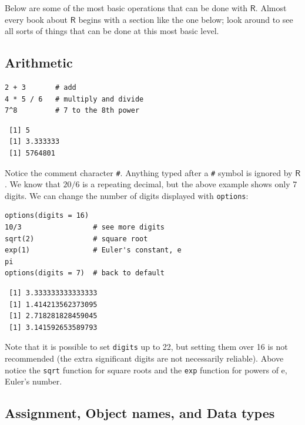 \documentclass[captions=tableheading]{scrbook}
\begin{document}
Below are some of the most basic operations that can be done with \(\mathsf{R}\). Almost every book about \(\mathsf{R}\) begins with a section like the one below; look around to see all sorts of things that can be done at this most basic level.
\subsection{Arithmetic}
\label{sec-2-3-1}
\label{sub-Arithmetic}



\begin{verbatim}
2 + 3       # add
4 * 5 / 6   # multiply and divide
7^8         # 7 to the 8th power
\end{verbatim}

\begin{verbatim}
 [1] 5
 [1] 3.333333
 [1] 5764801
\end{verbatim}

Notice the comment character \texttt{\#}. Anything typed after a \texttt{\#} symbol is ignored by \(\mathsf{R}\). We know that \(20/6\) is a repeating decimal, but the above example shows only 7 digits. We can change the number of digits displayed with \texttt{options}:


\begin{verbatim}
options(digits = 16)
10/3                 # see more digits
sqrt(2)              # square root
exp(1)               # Euler's constant, e
pi       
options(digits = 7)  # back to default
\end{verbatim}

\begin{verbatim}
 [1] 3.333333333333333
 [1] 1.414213562373095
 [1] 2.718281828459045
 [1] 3.141592653589793
\end{verbatim}

Note that it is possible to set \texttt{digits} up to 22, but setting them over 16 is not recommended (the extra significant digits are not necessarily reliable). Above notice the \texttt{sqrt} function for square roots and the \texttt{exp} function for powers of \(\mathrm{e}\), Euler's number.
\subsection{Assignment, Object names, and Data types}
\label{sec-2-3-2}
\label{sub-Assignment-Object-names}
\end{document}
